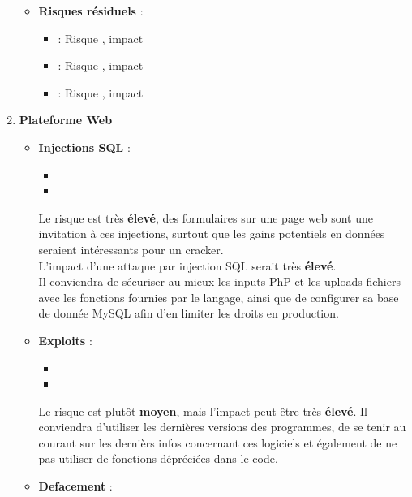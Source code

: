 \documentclass[a4paper,10pt,final,fleqn]{article}
\begin{document}
\begin{enumerate}
\begin{itemize}
							\item \textbf{Risques résiduels} : \\

								\begin{itemize}
									\item \textbf{} : Risque , impact 
									\item \textbf{} : Risque , impact 
									\item \textbf{} : Risque , impact \\
								\end{itemize}
						\end{itemize}
						
					\item \textbf{Plateforme Web}

						\begin{itemize}
							\item \textbf{Injections SQL} : \\

								\begin{itemize}
									\item 
									\item 
								\end{itemize}

							Le risque est très \textbf{élevé}, des formulaires sur une page web sont une invitation à ces injections, surtout que les gains potentiels en données seraient intéressants pour un cracker.\\
							L'impact d'une attaque par injection SQL serait très \textbf{élevé}.\\
							Il conviendra de sécuriser au mieux les inputs PhP et les uploads fichiers avec les fonctions fournies par le langage, ainsi que de configurer sa base de donnée MySQL afin d'en limiter les droits en production.\\
							\item \textbf{Exploits} : \\

								\begin{itemize}
									\item 
									\item 
								\end{itemize}

							Le risque est plutôt \textbf{moyen}, mais l'impact peut être très \textbf{élevé}. Il conviendra d'utiliser les dernières versions des programmes, de se tenir au courant sur les dernièrs infos concernant ces logiciels et également de ne pas utiliser de fonctions dépréciées dans le code.
							\item \textbf{Defacement} : \\


\end{itemize}
\end{enumerate}
\end{document}
